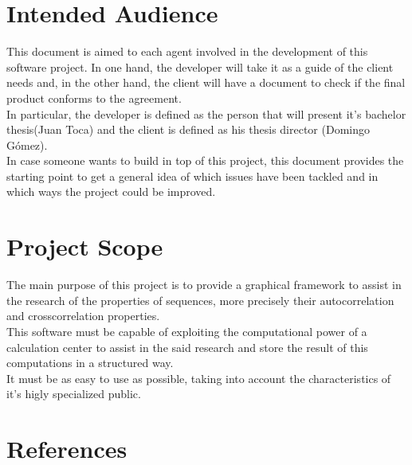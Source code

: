 \documentclass{scrreprt}
\begin{document}
\section{Intended Audience}

This document is aimed to each agent involved in the development of this
software project. In one hand, the developer will take it as a guide of the
client needs and, in the other hand, the client will have a document to
check if the final product conforms to the agreement.\\

In particular, the developer is defined as the person that will present it's
bachelor thesis(Juan Toca) and the client is defined as his thesis director
(Domingo Gómez).\\

In case someone wants to build in top of this project, this document provides
the starting point to get a general idea of which issues have been tackled and
in which ways the project could be improved.\\



\section{Project Scope}

The main purpose of this project is to provide a graphical framework to assist
in the research of the properties of sequences, more precisely their
autocorrelation and crosscorrelation properties.\\

This software must be capable of exploiting the computational power of a
calculation center to assist in the said research and store the result of this computations in a structured way.\\

It must be as easy to use as possible, taking into account the characteristics
of it's higly specialized public.\\


\section{References}
\end{document}
